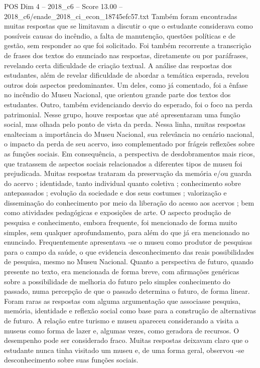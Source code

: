 \begin{textsample}{POS Dim 4 – 2018\_c6 – Score 13.00 – 2018\_c6/enade\_2018\_ci\_econ\_18745efc57.txt}
Também foram encontradas muitas respostas que se limitavam a discutir o que o estudante considerava como possíveis causas do incêndio, a falta de manutenção, questões políticas e de gestão, sem responder ao que foi solicitado.
Foi também recorrente a transcrição de frases dos textos do enunciado nas respostas, diretamente ou por paráfrases, revelando certa dificuldade de criação textual.
A análise das respostas dos estudantes, além de revelar dificuldade de abordar a temática esperada, revelou outros dois aspectos predominantes.
Um deles, como já comentado, foi a ênfase no incêndio do Museu Nacional, que orientou grande parte dos textos dos estudantes.
Outro, também evidenciando desvio do esperado, foi o foco na perda patrimonial.
Nesse grupo, houve respostas que até apresentaram uma função social, mas olhada pelo ponto de vista da perda.
Nessa linha, muitas respostas enalteciam a importância do Museu Nacional, sua relevância no cenário nacional, o impacto da perda de seu acervo, isso complementado por frágeis reflexões sobre as funções sociais.
Em consequência, a perspectiva de desdobramentos mais ricos, que tratassem de aspectos sociais relacionados a diferentes tipos de museu foi prejudicada.
Muitas respostas trataram da preservação da memória e/ou guarda do acervo ; identidade, tanto individual quanto coletiva ; conhecimento sobre antepassados ; evolução da sociedade e dos seus costumes ; valorização e disseminação do conhecimento por meio da liberação do acesso aos acervos ; bem como atividades pedagógicas e exposições de arte.
O aspecto produção de pesquisa e conhecimento, embora frequente, foi mencionado de forma muito simples, sem qualquer aprofundamento, para além do que já era mencionado no enunciado.
Frequentemente apresentava -se o museu como produtor de pesquisas para o campo da saúde, o que evidencia desconhecimento das reais possibilidades de pesquisa, mesmo no Museu Nacional.
Quanto a perspectiva de futuro, quando presente no texto, era mencionada de forma breve, com afirmações genéricas sobre a possibilidade de melhoria do futuro pelo simples conhecimento do passado, numa percepção de que o passado determina o futuro, de forma linear.
Foram raras as respostas com alguma argumentação que associasse pesquisa, memória, identidade e reflexão social como base para a construção de alternativas de futuro.
A relação entre turismo e museu apareceu considerando a visita a museus como forma de lazer e, algumas vezes, como geradora de recursos.
O desempenho pode ser considerado fraco.
Muitas respostas deixavam claro que o estudante nunca tinha visitado um museu e, de uma forma geral, observou -se desconhecimento sobre suas funções sociais.

\end{textsample}
